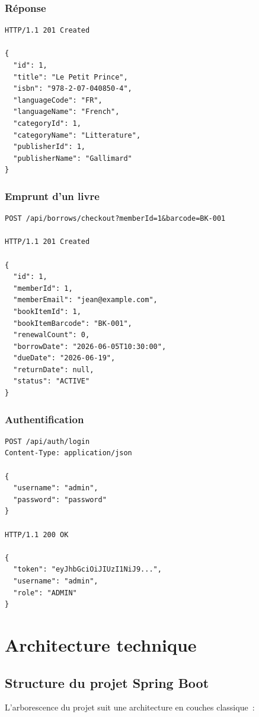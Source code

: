 \documentclass[12pt,a4paper]{article}
\begin{document}
\subsubsection{R\'eponse}
\begin{lstlisting}[style=jsonstyle]
HTTP/1.1 201 Created

{
  "id": 1,
  "title": "Le Petit Prince",
  "isbn": "978-2-07-040850-4",
  "languageCode": "FR",
  "languageName": "French",
  "categoryId": 1,
  "categoryName": "Litterature",
  "publisherId": 1,
  "publisherName": "Gallimard"
}
\end{lstlisting}

\subsubsection{Emprunt d'un livre}
\begin{lstlisting}[style=jsonstyle]
POST /api/borrows/checkout?memberId=1&barcode=BK-001

HTTP/1.1 201 Created

{
  "id": 1,
  "memberId": 1,
  "memberEmail": "jean@example.com",
  "bookItemId": 1,
  "bookItemBarcode": "BK-001",
  "renewalCount": 0,
  "borrowDate": "2026-06-05T10:30:00",
  "dueDate": "2026-06-19",
  "returnDate": null,
  "status": "ACTIVE"
}
\end{lstlisting}

\subsubsection{Authentification}
\begin{lstlisting}[style=jsonstyle]
POST /api/auth/login
Content-Type: application/json

{
  "username": "admin",
  "password": "password"
}

HTTP/1.1 200 OK

{
  "token": "eyJhbGciOiJIUzI1NiJ9...",
  "username": "admin",
  "role": "ADMIN"
}
\end{lstlisting}

\newpage
\section{Architecture technique}

\subsection{Structure du projet Spring Boot}
L'arborescence du projet suit une architecture en couches classique~:
\end{document}
